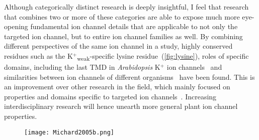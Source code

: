 \documentclass[11pt]{article}
\begin{document}
\begin{multicols*}{2}
Although categorically distinct research is deeply insightful, I feel that research that combines two or more of these categories are able to expose much more eye-opening fundamental ion channel details that are applicable to not only the targeted ion channel, but to entire ion channel families as well. By combining different perspectives of the same ion channel in a study, highly conserved residues such as the K$^{+}$\textsubscript{weak}-specific lysine residue~(\autoref{fig:lysine})\citep{Michard2005b}, roles of specific domains, including the last TMD in \textit{Arabidopsis} K$^{+}$ ion channels~\citep{Gajdanowicz2009} and similarities between ion channels of different organisms~\citep{Cellier2004} have been found. This is an improvement over other research in the field, which mainly focused on properties and domains specific to targeted ion channels~\citep{Becker2003,Li2008,Liu2006}. Increasing interdisciplinary research will hence unearth more general plant ion channel properties.

\begin{figure}[H]
  \centering
    \texttt{[image: Michard2005b.png]}
  \label{fig:lysine}
\end{figure}


\end{multicols*}
\end{document}
